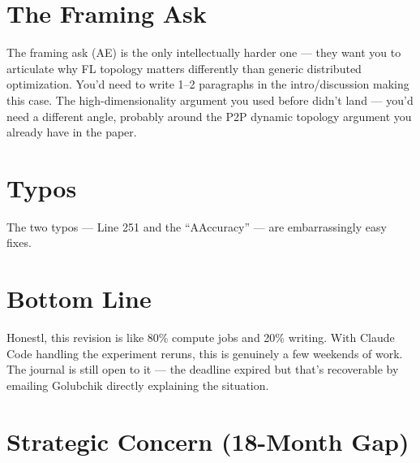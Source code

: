 \documentclass[11pt]{article}
\begin{document}
\section{The Framing Ask}

\begin{chatquote}
The framing ask (AE) is the only intellectually harder one --- they want you to articulate why FL topology matters differently than generic distributed optimization. You'd need to write 1--2 paragraphs in the intro/discussion making this case. The high-dimensionality argument you used before didn't land --- you'd need a different angle, probably around the P2P dynamic topology argument you already have in the paper.
\end{chatquote}

\section{Typos}

\begin{chatquote}
The two typos --- Line 251 and the ``AAccuracy'' --- are embarrassingly easy fixes.
\end{chatquote}

\section{Bottom Line}

\begin{chatquote}
Honestl, this revision is like 80\% compute jobs and 20\% writing. With Claude Code handling the experiment reruns, this is genuinely a few weekends of work. The journal is still open to it --- the deadline expired but that's recoverable by emailing Golubchik directly explaining the situation.
\end{chatquote}

\section{Strategic Concern (18-Month Gap)}
\end{document}
